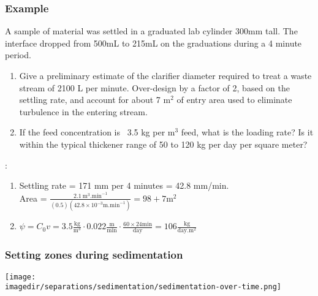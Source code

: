 \begin{frame}\frametitle{Example}
 	A sample of material was settled in a graduated lab cylinder 300mm tall. The interface dropped from 500mL to 215mL on the graduations during a 4 minute period. 
	
	\begin{enumerate}
		\item	Give a preliminary estimate of the clarifier diameter required to treat a waste stream of 2100 L per minute. Over-design by a factor of 2, based on the settling rate, and account for about 7 $\text{m}^2$ of entry area used to eliminate turbulence in the entering stream.
		\item	If the feed concentration is {}~3.5 kg per $\text{m}^3$ feed, what is the loading rate? Is it within the typical thickener range of 50 to 120 kg per day per square meter? 
	\end{enumerate}
	{\color{myGreen}{Answers}}:
	\begin{enumerate}
		\item	Settling rate = 171 mm per 4 minutes = 42.8 mm/min.\\Area = $\displaystyle \frac{2.1~\text{m}^3.\text{min}^{-1}}{\left(0.5\right)\left(42.8 \times 10^{-3} \text{m}.\text{min}^{-1}\right)} = 98 + 7 \text{m}^2$
		\item	$\psi = C_0 v = 3.5 \displaystyle\frac{\text{kg}}{\text{m}^3} \cdot 0.022 \displaystyle \frac{\text{m}}{\text{min}} \cdot \displaystyle\frac{60 \times 24 \text{min}}{\text{day}} = 106 \displaystyle \frac{\text{kg}}{\text{day}.\text{m}^2}$
	\end{enumerate}	
\end{frame}
	
\begin{frame}\frametitle{Setting zones during sedimentation}
	\begin{center}
		\texttt{[image: \\imagedir/separations/sedimentation/sedimentation-over-time.png]}
	\end{center}
\end{frame}

